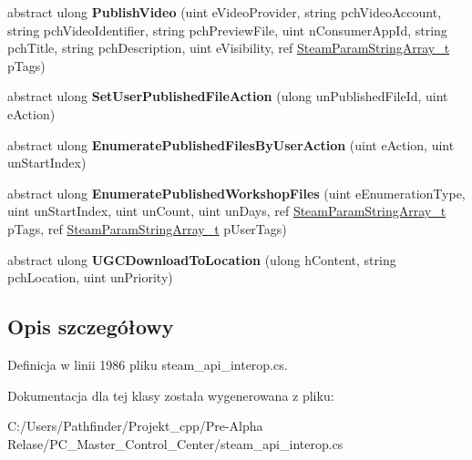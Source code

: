 \begin{DoxyCompactItemize}
abstract ulong {\bfseries Publish\+Video} (uint e\+Video\+Provider, string pch\+Video\+Account, string pch\+Video\+Identifier, string pch\+Preview\+File, uint n\+Consumer\+App\+Id, string pch\+Title, string pch\+Description, uint e\+Visibility, ref \hyperlink{struct_valve_1_1_steamworks_1_1_steam_param_string_array__t}{Steam\+Param\+String\+Array\+\_\+t} p\+Tags)
\item 
\mbox{\label{class_valve_1_1_steamworks_1_1_i_steam_remote_storage_a37bcae481ec3329285b9efda49df20f1}} 
abstract ulong {\bfseries Set\+User\+Published\+File\+Action} (ulong un\+Published\+File\+Id, uint e\+Action)
\item 
\mbox{\label{class_valve_1_1_steamworks_1_1_i_steam_remote_storage_aaf73bf4617e9834146924c813aaecdb3}} 
abstract ulong {\bfseries Enumerate\+Published\+Files\+By\+User\+Action} (uint e\+Action, uint un\+Start\+Index)
\item 
\mbox{\label{class_valve_1_1_steamworks_1_1_i_steam_remote_storage_ababa473d5722150ac7f8d979722a6a1f}} 
abstract ulong {\bfseries Enumerate\+Published\+Workshop\+Files} (uint e\+Enumeration\+Type, uint un\+Start\+Index, uint un\+Count, uint un\+Days, ref \hyperlink{struct_valve_1_1_steamworks_1_1_steam_param_string_array__t}{Steam\+Param\+String\+Array\+\_\+t} p\+Tags, ref \hyperlink{struct_valve_1_1_steamworks_1_1_steam_param_string_array__t}{Steam\+Param\+String\+Array\+\_\+t} p\+User\+Tags)
\item 
\mbox{\label{class_valve_1_1_steamworks_1_1_i_steam_remote_storage_adef9287cf9911bfe98cfada28b0d0715}} 
abstract ulong {\bfseries U\+G\+C\+Download\+To\+Location} (ulong h\+Content, string pch\+Location, uint un\+Priority)
\end{DoxyCompactItemize}


\subsection{Opis szczegółowy}


Definicja w linii 1986 pliku steam\+\_\+api\+\_\+interop.\+cs.



Dokumentacja dla tej klasy została wygenerowana z pliku\+:\begin{DoxyCompactItemize}
\item 
C\+:/\+Users/\+Pathfinder/\+Projekt\+\_\+cpp/\+Pre-\/\+Alpha Relase/\+P\+C\+\_\+\+Master\+\_\+\+Control\+\_\+\+Center/steam\+\_\+api\+\_\+interop.\+cs\end{DoxyCompactItemize}
